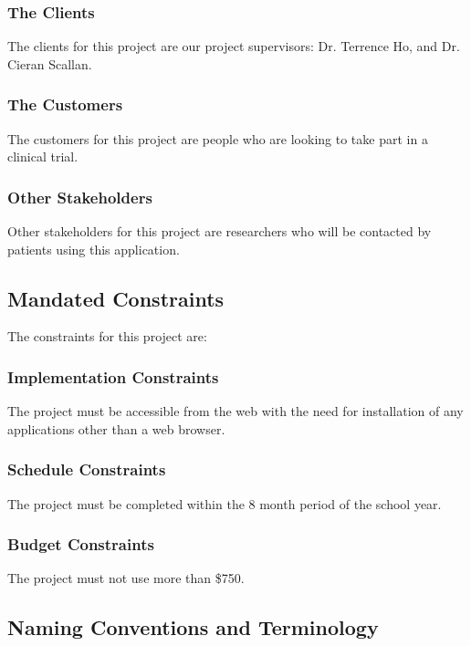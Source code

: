 \documentclass[12pt, titlepage]{article}
\begin{document}
\subsubsection{The Clients}

The clients for this project are our project supervisors: Dr. Terrence Ho, and Dr. Cieran Scallan. 

\subsubsection{The Customers}

The customers for this project are people who are looking to take part in a clinical trial.

\subsubsection{Other Stakeholders}

Other stakeholders for this project are researchers who will be contacted by patients using this application.

\subsection{Mandated Constraints}

The constraints for this project are:

\subsubsection{Implementation Constraints}
The project must be accessible from the web with the need for installation of any applications other than a web browser.

\subsubsection{Schedule Constraints}
The project must be completed within the 8 month period of the school year.

\subsubsection{Budget Constraints}
The project must not use more than \$750.

\subsection{Naming Conventions and Terminology}
\end{document}

